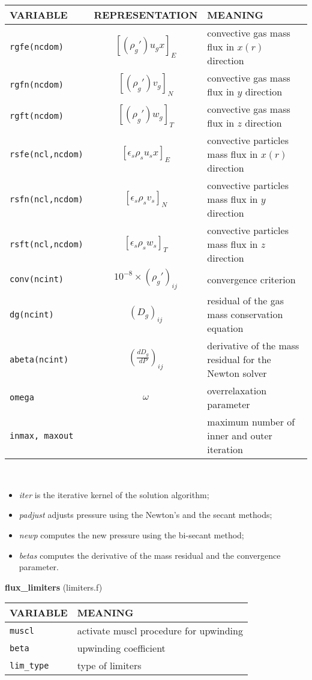 \begin{tabular}{|p{6cm}|c|p{6cm}|}\hline
VARIABLE & REPRESENTATION & MEANING\\\hline
\tt rgfe(ncdom) & $\left[ (\rho_g')u_gx \right]_{E} $ & convective gas mass flux in $x(r)$ direction\\\hline
\tt rgfn(ncdom) & $\left[ (\rho_g')v_g \right]_{N} $ & convective gas mass flux in $y$ direction\\\hline
\tt rgft(ncdom) & $\left[ (\rho_g')w_g \right]_{T} $ & convective gas mass flux in $z$ direction\\\hline
\tt rsfe(ncl,ncdom) & $\left[ \epsilon_s\rho_su_sx \right]_{E} $ & convective particles mass flux in $x(r)$ direction\\\hline
\tt rsfn(ncl,ncdom) & $\left[ \epsilon_s\rho_sv_s \right]_{N} $ & convective particles mass flux in $y$ direction\\\hline
\tt rsft(ncl,ncdom) & $\left[ \epsilon_s\rho_sw_s \right]_{T} $ & convective particles mass flux in $z$ direction\\\hline
\tt conv(ncint) & $10^{-8}\times(\rho_g')_{ij}$ & convergence criterion\\\hline
\tt dg(ncint) & $(D_g)_{ij}$ & residual of the gas mass conservation equation \\\hline
\tt abeta(ncint) & $\left(\frac{dD_g}{dP}\right)_{ij}$ & derivative of the mass residual for the Newton solver\\\hline
\tt omega & $\omega$ & overrelaxation parameter \\\hline
\tt inmax, maxout && maximum number of inner and outer iteration\\\hline
\end{tabular}\\
\begin{itemize}
\item{\em iter} is the iterative kernel of the solution algorithm;
\item{\em padjust} adjusts pressure using the Newton's and the secant methods;
\item{\em newp} computes the new pressure using the bi-secant method;
\item{\em betas} computes the derivative of the mass residual and the convergence parameter.
\end{itemize}
%
%
{\large{\bf flux\_limiters}} (limiters.f)\\[5mm]
\begin{tabular}{|p{6cm}|p{6cm}|}\hline
VARIABLE &  MEANING\\\hline
\tt  muscl    & activate muscl procedure for upwinding \\\hline
\tt  beta     & upwinding coefficient \\\hline
\tt  lim\_type & type of limiters \\\hline
\end{tabular}\\
